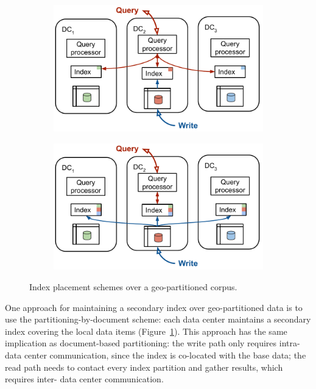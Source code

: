\begin{figure}[H]
  \centering
  \begin{subfigure}[b]{0.48\textwidth}
    \centering
    \includegraphics[width=\textwidth]{./figures/design_space/geo_paritioning_local_index.pdf}
    \caption{}
    \label{fig:geo_paritioning_local_index}
  \end{subfigure}
  \hfill
  \begin{subfigure}[b]{0.48\textwidth}
    \centering
    \includegraphics[width=\textwidth]{./figures/design_space/geo_paritioning_global_indexes.pdf}
    \caption{}
    \label{fig:geo_paritioning_global_indexes}
  \end{subfigure}
  \caption{Index placement schemes over a geo-partitioned corpus.}
  \label{fig:index_placement_geo_partitioning}
\end{figure}

One approach for maintaining a secondary index over geo-partitioned data is to use the partitioning-by-document scheme:
each data center maintains a secondary index covering the local data items (Figure~\ref{fig:geo_paritioning_local_index}).
This approach has the same implication as document-based partitioning:
the write path only requires intra- data center communication, since the index is co-located with the base data;
the read path needs to contact every index partition and gather results, which requires inter- data center
communication.

